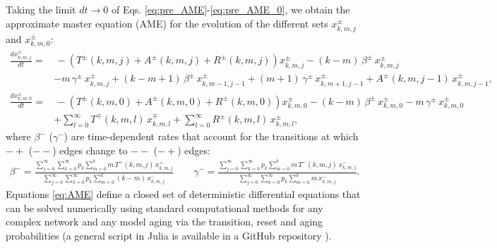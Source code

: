 Taking the limit $dt \to 0$ of Eqs. \eqref{eq:pre_AME}-\eqref{eq:pre_AME_0}, we obtain the approximate master equation (AME) for the evolution of the different sets $x^{\pm}_{k,m,j}$ and $x^{\pm}_{k,m,0}$:
\begin{align}
\label{eq:AME}
    \frac{d x^{\pm}_{k,m,j}}{dt} = & \, - \left( T^{\pm} (k,m,j) + A^{\pm} (k,m,j) + R^{\pm} (k,m,j) \right) x^{\pm}_{k,m,j} - (k - m)\, \beta^{\pm}\,  x^{\pm}_{k,m,j} \nonumber\\
    & - m \, \gamma^{\pm}\, x^{\pm}_{k,m,j} + (k-m+1)\, \beta^{\pm} \,   x^{\pm}_{k,m-1,j-1} + (m+1)\, \gamma^{\pm} \,  x^{\pm}_{k,m+1,j-1} + A^{\pm} (k,m,j-1)\,  x^{\pm}_{k,m,j-1},  \\
    \frac{d x^{\pm}_{k,m,0}}{dt}  = & \, - \left( T^{\pm} (k,m,0) + A^{\pm} (k,m,0) + R^{\pm} (k,m,0) \right) x^{\pm}_{k,m,0} - (k - m) \, \beta^{\pm}\,  x^{\pm}_{k,m,0} - m\, \gamma^{\pm} \,  x^{\pm}_{k,m,0}\nonumber\\
    & + \sum_{l = 0}^{\infty} T^{\mp} (k,m,l)\,  x^{\mp}_{k,m,l} + \sum_{l = 0}^{\infty} R^{\pm} (k,m,l)\, x^{\pm}_{k,m,l},\nonumber
\end{align}
where $\beta^{-}$ ($\gamma^{-}$) are time-dependent rates that account for the transitions at which $-+$ ($--$) edges change to $--$ ($-+$) edges:
\begin{align}
    \beta^{-} = \frac{\sum_{j=0}^{\infty} \sum_{k=0}^{\infty} p_k \sum_{m = 0}^{k} m \, T^{+} (k,m,j) \, x^{+}_{k,m,j}}{\sum_{j=0}^{\infty} \sum_{k=0}^{\infty} p_k \sum_{m = 0}^{k} (k - m)\,  x^{-}_{k,m,j}} \quad \quad \gamma^{-} = \frac{\sum_{j=0}^{\infty} \sum_{k=0}^{\infty} p_k \sum_{m = 0}^{k} m\, T^{-} (k,m,j) \, x^{-}_{k,m,j}}{\sum_{j=0}^{\infty} \sum_{k=0}^{\infty} p_k \sum_{m = 0}^{k} m\,  x^{-}_{k,m,j}}.
\end{align}
Equations \ref{eq:AME} define a closed set of deterministic differential equations that can be solved numerically using standard computational methods for any complex network and any model aging via the transition, reset and aging probabilities (a general script in Julia is available in a GitHub repository \cite{link_git}).
    
